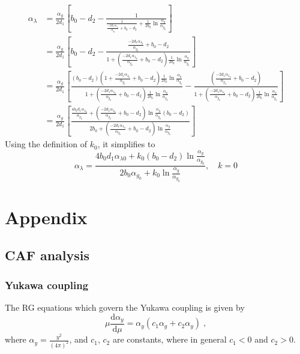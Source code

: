 \begin{align*}
    \alpha_\lambda &= \frac{\alpha_g}{2d_1} \left[ b_0 - d_2 - \frac{1}{\frac{1}{\frac{-2d_1\alpha_{\lambda_0}}{\alpha_{g_0}} + b_0 - d_2}+ \frac{1}{2b_0} \ln \frac{\alpha_q}{\alpha_{g_0}}}  \right]
    \\&= \frac{\alpha_g}{2d_1} \left[ b_0 - d_2 - \frac{\frac{-2d_1\alpha_{\lambda_0}}{\alpha_{g_0}} + b_0 - d_2}{1+\left(\frac{-2d_1\alpha_{\lambda_0}}{\alpha_{g_0}} + b_0 - d_2\right)\frac{1}{2b_0} \ln \frac{\alpha_q}{\alpha_{g_0}}}   \right]
    \\&= \frac{\alpha_g}{2d_1} \left[ \frac{(b_0 - d_2)\left(1+\frac{-2d_1\alpha_{\lambda_0}}{\alpha_{g_0}} + b_0 - d_2\right)\frac{1}{2b_0} \ln \frac{\alpha_q}{\alpha_{g_0}}}{{1} + \left(\frac{-2d_1\alpha_{\lambda_0}}{\alpha_{g_0}} + b_0 - d_2\right)\frac{1}{2b_0} \ln \frac{\alpha_q}{\alpha_{g_0}}} -\frac{\left(\frac{-2d_1\alpha_{\lambda_0}}{\alpha_{g_0}} + b_0 - d_2\right)}{{1} + \left(\frac{-2d_1\alpha_{\lambda_0}}{\alpha_{g_0}} + b_0 - d_2\right)\frac{1}{2b_0} \ln \frac{\alpha_q}{\alpha_{g_0}}} \right]
    \\&=\frac{\alpha_g}{2d_1} \left[ \frac{\frac{4b_0d_1\alpha_{\lambda_0}}{\alpha_{g_0}}+\left(\frac{-2d_1\alpha_{\lambda_0}}{\alpha_{g_0}} + b_0 - d_2\right)\ln \frac{\alpha_g}{\alpha_{g_0}}(b_0-d_2)}{{2b_0} + \left(\frac{-2d_1\alpha_{\lambda_0}}{\alpha_{g_0}} + b_0 - d_2\right) \ln \frac{\alpha_g}{\alpha_{g_0}}} \right]
\end{align*}
Using the definition of $k_0$, it simplifies to
\begin{equation}
    \boxed{\alpha_{\lambda} = \frac{ 4b_0 d_1 \alpha_{\lambda0} + k_0 (b_0 - d_2) \ln\frac{\alpha_g}{\alpha_{g_0}} }{ 2b_0 \alpha_{g_0} + k_0 \ln\frac{\alpha_g}{\alpha_{g_0}} } , \quad k=0 }
    \label{eq:alphalamk0}
\end{equation}


\appendix
\section{Appendix}
\subsection{CAF analysis} \label{app:caf}
\subsubsection{Yukawa coupling}
The RG equations which govern the Yukawa coupling is given by
\begin{equation}
    \mu \frac{\text{d}\alpha_y}{\text{d}\mu}=\alpha_y(c_1\alpha_g+c_2\alpha_y)\;,
\end{equation}
where $\alpha_y=\frac{y^2}{(4\pi)^2}$, and $c_1$, $c_2$ are constants, where in general $c_1<0$ and $c_2>0$.  

